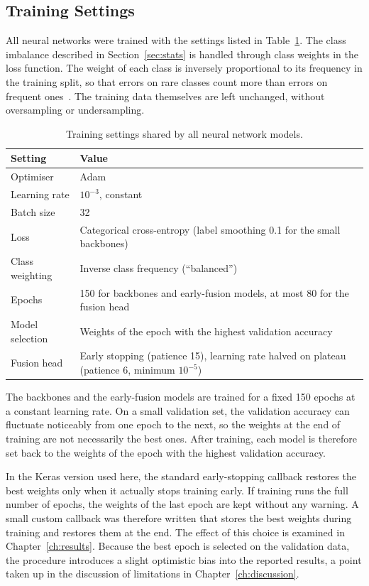\subsection{Training Settings}
\label{sec:settings}

All neural networks were trained with the settings listed in
Table~\ref{tab:training}. The class imbalance described in
Section~\ref{sec:stats} is handled through class weights in the loss function.
The weight of each class is inversely proportional to its frequency in the
training split, so that errors on rare classes count more than errors on frequent
ones~\cite{pedregosa2011scikit}. The training data themselves are left unchanged, without
oversampling or undersampling.

\begin{table}[htbp]
\centering
\small
\renewcommand{\arraystretch}{1.2}
\begin{tabularx}{\textwidth}{|p{3.6cm}|X|}
\hline
\textbf{Setting} & \textbf{Value} \\
\hline
Optimiser & Adam~\cite{kingma2015adam} \\
Learning rate & $10^{-3}$, constant \\
Batch size & 32 \\
Loss & Categorical cross-entropy (label smoothing 0.1 for the small backbones) \\
Class weighting & Inverse class frequency (``balanced'') \\
Epochs & 150 for backbones and early-fusion models, at most 80 for the fusion head \\
Model selection & Weights of the epoch with the highest validation accuracy \\
Fusion head & Early stopping (patience 15), learning rate halved on plateau (patience 6, minimum $10^{-5}$) \\
\hline
\end{tabularx}
\caption{Training settings shared by all neural network models.}
\label{tab:training}
\end{table}

The backbones and the early-fusion models are trained for a fixed 150 epochs at a
constant learning rate. On a small validation set, the validation accuracy can
fluctuate noticeably from one epoch to the next, so the weights at the end of
training are not necessarily the best ones. After training, each model is
therefore set back to the weights of the epoch with the highest validation
accuracy.

In the Keras version used here, the standard early-stopping callback restores the
best weights only when it actually stops training early. If training runs the full
number of epochs, the weights of the last epoch are kept without any warning. A
small custom callback was therefore written that stores the best weights during
training and restores them at the end. The effect of this choice is examined in
Chapter~\ref{ch:results}. Because the best epoch is selected on the validation
data, the procedure introduces a slight optimistic bias into the reported results,
a point taken up in the discussion of limitations in
Chapter~\ref{ch:discussion}.

